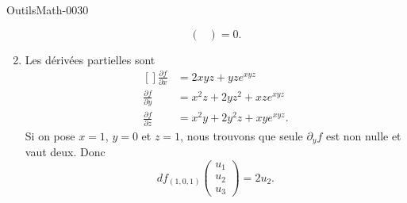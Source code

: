 \begin{corrige}{OutilsMath-0030}
\begin{enumerate}
\begin{equation}
\begin{pmatrix}
                \end{pmatrix}=0.
            \end{equation}
        \item
            Les dérivées partielles sont
            \begin{equation}
                \begin{aligned}[]
                    \frac{ \partial f }{ \partial x }&=2xyz+yz e^{xyz}\\
                    \frac{ \partial f }{ \partial y }&=x^2z+2yz^2+xz e^{xyz}\\
                    \frac{ \partial f }{ \partial z }&=x^2y+2y^2z+xy e^{xyz}.
                \end{aligned}
            \end{equation}
            Si on pose $x=1$, $y=0$ et $z=1$, nous trouvons que seule $\partial_yf$ est non nulle et vaut deux. Donc
            \begin{equation}
                df_{(1,0,1)}\begin{pmatrix}
                    u_1    \\ 
                    u_2    \\ 
                    u_3    
                \end{pmatrix}=2u_2.
            \end{equation}
    \end{enumerate}

\end{corrige}
